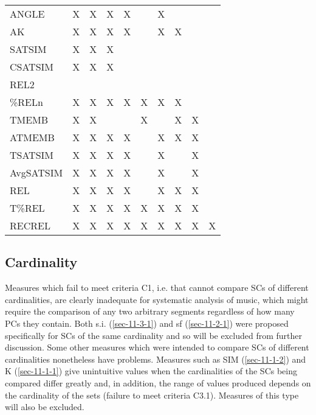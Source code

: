 \documentclass{article}
\begin{document}
\begin{table}[htb]
\begin{center}
\begin{tabular}{llllllllll}
 ANGLE       &  X   &  X   &  X     &  X     &        &  X     &      &      &      \\
 AK          &  X   &  X   &  X     &  X     &        &  X     &  X   &      &      \\
 SATSIM      &  X   &  X   &  X     &        &        &        &      &      &      \\
 CSATSIM     &  X   &  X   &  X     &        &        &        &      &      &      \\
 REL2        &      &      &        &        &        &        &      &      &      \\
 \%RELn      &  X   &  X   &  X     &  X     &  X     &  X     &  X   &      &      \\
 TMEMB       &  X   &  X   &        &        &  X     &        &  X   &  X   &      \\
 ATMEMB      &  X   &  X   &  X     &  X     &        &  X     &  X   &  X   &      \\
 TSATSIM     &  X   &  X   &  X     &  X     &        &  X     &      &  X   &      \\
 AvgSATSIM   &  X   &  X   &  X     &  X     &        &  X     &      &  X   &      \\
 REL         &  X   &  X   &  X     &  X     &        &  X     &  X   &  X   &      \\
 T\%REL      &  X   &  X   &  X     &  X     &  X     &  X     &  X   &  X   &      \\
 RECREL      &  X   &  X   &  X     &  X     &  X     &  X     &  X   &  X   &  X   \\
\hline
\end{tabular}
\end{center}
\end{table}
\subsection{Cardinality}
\label{sec-6-2}

Measures which fail to meet criteria C1, i.e. that cannot compare SCs
of different cardinalities, are clearly inadequate for systematic
analysis of music, which might require the comparison of any two
arbitrary segments regardless of how many PCs they contain. Both
s.i. (\ref{sec-11-3-1}) and sf (\ref{sec-11-2-1}) were proposed specifically for SCs of the same
cardinality and so will be excluded from further discussion. Some
other measures which were intended to compare SCs of different
cardinalities nonetheless have problems. Measures such as SIM (\ref{sec-11-1-2})
and K (\ref{sec-11-1-1}) give unintuitive values when the cardinalities of the SCs
being compared differ greatly and, in addition, the range of values
produced depends on the cardinality of the sets (failure to meet
criteria C3.1). Measures of this type will also be excluded.
\end{document}
